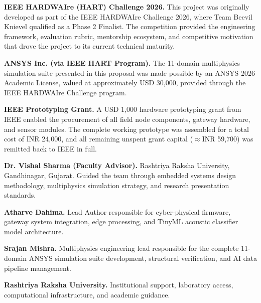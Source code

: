 \documentclass[12pt,a4paper]{article}
\begin{document}
\textbf{IEEE HARDWAIre (HART) Challenge 2026.} This project was originally developed as part of the IEEE HARDWAIre Challenge 2026, where Team Beevil Knievel qualified as a Phase 2 Finalist. The competition provided the engineering framework, evaluation rubric, mentorship ecosystem, and competitive motivation that drove the project to its current technical maturity.

\textbf{ANSYS Inc. (via IEEE HART Program).} The 11-domain multiphysics simulation suite presented in this proposal was made possible by an ANSYS 2026 Academic License, valued at approximately USD 30,000, provided through the IEEE HARDWAIre Challenge program. 

\textbf{IEEE Prototyping Grant.} A USD 1,000 hardware prototyping grant from IEEE enabled the procurement of all field node components, gateway hardware, and sensor modules. The complete working prototype was assembled for a total cost of INR 24,000, and all remaining unspent grant capital ($\approx$INR 59,700) was remitted back to IEEE in full.

\textbf{Dr. Vishal Sharma (Faculty Advisor).} Rashtriya Raksha University, Gandhinagar, Gujarat. Guided the team through embedded systems design methodology, multiphysics simulation strategy, and research presentation standards.

\textbf{Atharve Dahima.} Lead Author responsible for cyber-physical firmware, gateway system integration, edge processing, and TinyML acoustic classifier model architecture.

\textbf{Srajan Mishra.} Multiphysics engineering lead responsible for the complete 11-domain ANSYS simulation suite development, structural verification, and AI data pipeline management.

\textbf{Rashtriya Raksha University.} Institutional support, laboratory access, computational infrastructure, and academic guidance.
\end{document}
